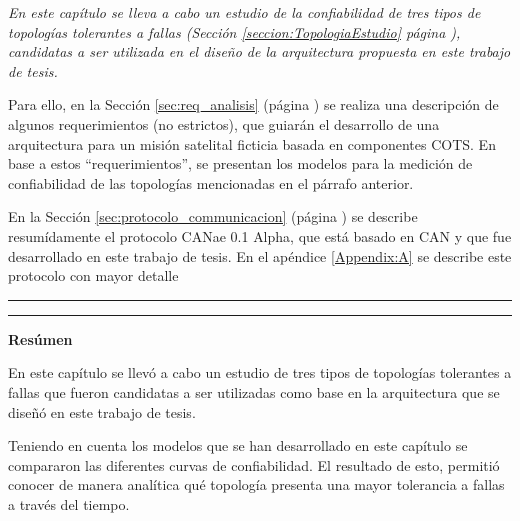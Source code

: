 \vspace{1cm}

\itshape
En este capítulo se lleva a cabo un estudio de la confiabilidad de tres tipos
de topologías tolerantes a fallas (Sección \ref{seccion:TopologiaEstudio}
página \pageref{seccion:TopologiaEstudio}), candidatas a ser utilizada en el
diseño de la arquitectura propuesta en este trabajo de tesis.

Para ello, en la Sección \ref{sec:req_analisis} (página \pageref{sec:req_analisis})
se realiza una descripción de algunos requerimientos (no estrictos), que guiarán
el desarrollo de una arquitectura para un misión satelital ficticia basada en
componentes COTS. En base a estos ``requerimientos'', se presentan los modelos para
la medición de confiabilidad de las topologías mencionadas en el párrafo anterior. 

En la Sección \ref{sec:protocolo_communicacion} (página \pageref{sec:protocolo_communicacion})
se describe resumídamente el protocolo CANae 0.1 Alpha, que está basado en CAN y
que fue desarrollado en este trabajo de tesis. En el apéndice \ref{Appendix:A}
se describe este protocolo con mayor detalle
\upshape

\noindent\rule{\textwidth}{2pt}

\vspace{1cm}
%





\vspace{1cm}
\noindent\rule{\textwidth}{2pt}

\textbf{\Large{Resúmen}}

En este capítulo se llevó a cabo un estudio de tres tipos de topologías tolerantes
a fallas que fueron candidatas a ser utilizadas como base en la
arquitectura que se diseñó en este trabajo de tesis. 

Teniendo en cuenta los modelos que se han desarrollado en este capítulo se compararon las diferentes curvas de confiabilidad. El resultado de esto, permitió conocer de manera analítica qué topología presenta una mayor tolerancia a fallas a través del tiempo.

